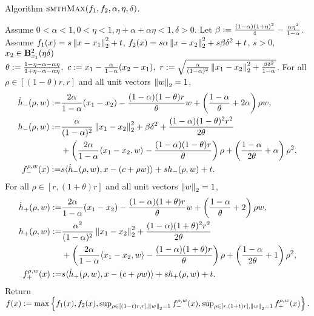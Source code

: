 \begin{algorithm}[t]
	\caption{Algorithm $\textsc{smthMax}(f_{1}, f_{2}, \alpha, \eta, \delta)$.}  
	\label{alg:algmaxsmth}
	\begin{algorithmic}[1]  %
		\STATEx Assume $0<\alpha<1, 0<\eta<1, \eta+\alpha+\alpha\eta<1, \delta>0$. Let $\beta := \frac{(1-\alpha)(1+\eta)^2}{4} - \frac{\alpha \eta^2}{1-\alpha}$.
		\STATEx Assume $f_{1}(x) = s\left\|{x-x_1 }\right\|_2^2 + t$, $f_{2}(x) = s\alpha \left\|{x-x_2}\right\|_2^2 + s\beta \delta^2 + t$, $s>0$, $x_2 \in \mathbf{B}^2_{x_1}({\eta\delta})$
		\STATE $\theta := \frac{1-\eta-\alpha-\alpha\eta}{1+\eta-\alpha-\alpha\eta},~c := x_1 - \frac{\alpha}{1-\alpha} (x_2-x_1),~ r := \sqrt{\frac{\alpha}{(1-\alpha)^2} \left\|{x_1-x_2}\right\|_2^2 + \frac{\beta\delta^2}{1-\alpha}}$.
		\STATE For all $\rho \in [(1-\theta)r,r]$ and all unit vectors $\left\|{w}\right\|_2 = 1$, 
		\begin{align*}
			\dot h_-(\rho,w) 
			:=& \frac{2\alpha}{1-\alpha}(x_1-x_2) 
			-	\frac{(1-\alpha)(1-\theta)r}{\theta} w 
			+ \left ( \frac{1-\alpha}{\theta}+2\alpha \right ) \rho w,\\
			h_-(\rho,w) 
			:= &\frac{\alpha}{(1-\alpha)^2} \left\|{x_1-x_2}\right\|_2^2
			+ \beta \delta^2 + \frac{(1-\alpha)(1-\theta)^2 r^2}{2\theta}\\
			&+ \left ( \frac{2\alpha}{1-\alpha} \langle x_1-x_2, w \rangle - \frac{(1-\alpha)(1-\theta)r}{\theta} \right ) \rho
			+ \left ( \frac{1-\alpha}{2\theta} + \alpha \right ) \rho^2,\\
			f_-^{\rho, w} (x) 
			:=& s \langle \dot h_-(\rho,w), x-(c+\rho w) \rangle + s h_-(\rho,w) + t.
		\end{align*}
		\STATE For all $\rho \in [r, (1+\theta)r]$ and all unit vectors $\left\|{w}\right\|_2 = 1$,
		\begin{align*}
			\dot h_+(\rho,w) 
			:=& \frac{2\alpha}{1-\alpha}(x_1-x_2) 
			- \frac{(1-\alpha)(1+\theta)r}{\theta} w 
			+ \left ( \frac{1-\alpha}{\theta}+2 \right ) \rho w,\\
			h_+(\rho,w) 
			:= &\frac{\alpha^2}{(1-\alpha)^2} \left\|{x_1-x_2}\right\|_2^2
			+ \frac{(1-\alpha)(1+\theta)^2 r^2}{2\theta}\\
			&+ \left ( \frac{2\alpha}{1-\alpha} \langle x_1-x_2, w \rangle - \frac{(1-\alpha)(1+\theta)r}{\theta} \right ) \rho
			+ \left ( \frac{1-\alpha}{2\theta} + 1 \right ) \rho^2,\\
			f_+^{\rho, w} (x) 
			:= & s \langle \dot h_+(\rho,w), x-(c+\rho w) \rangle + s h_+(\rho,w) + t.
		\end{align*}
		\STATE Return $f(x) := \max \left \{ 
		f_{1}(x), f_{2}(x), 
		\sup_{\rho \in [(1-t)r,r], \left\|{w}\right\|_2 = 1} f_-^{\rho, w}(x),
		\sup_{\rho \in [r,(1+t)r], \left\|{w}\right\|_2 = 1} f_+^{\rho, w}(x)
		\right \}.$
	\end{algorithmic}
\end{algorithm}

